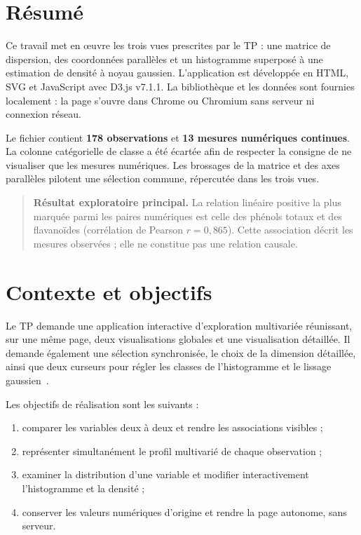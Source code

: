 \documentclass[11pt,a4paper]{article}
\newcommand{\metric}[2]{\textcolor{#1}{\textbf{#2}}}
\begin{document}
\tableofcontents
\thispagestyle{fancy}
\clearpage

\section{Résumé}
Ce travail met en œuvre les trois vues prescrites par le TP : une matrice de dispersion, des coordonnées parallèles et un histogramme superposé à une estimation de densité à noyau gaussien. L'application est développée en HTML, SVG et JavaScript avec D3.js v7.1.1. La bibliothèque et les données sont fournies localement : la page s'ouvre dans Chrome ou Chromium sans serveur ni connexion réseau.

Le fichier contient \metric{MatrixBlue}{178 observations} et \metric{MatrixBlue}{13 mesures numériques continues}. La colonne catégorielle de classe a été écartée afin de respecter la consigne de ne visualiser que les mesures numériques. Les brossages de la matrice et des axes parallèles pilotent une sélection commune, répercutée dans les trois vues.

\begin{quote}\small\color{Navy}\textbf{Résultat exploratoire principal.} La relation linéaire positive la plus marquée parmi les paires numériques est celle des phénols totaux et des flavanoïdes (corrélation de Pearson $r=0{,}865$). Cette association décrit les mesures observées ; elle ne constitue pas une relation causale.\end{quote}

\section{Contexte et objectifs}
Le TP demande une application interactive d'exploration multivariée réunissant, sur une même page, deux visualisations globales et une visualisation détaillée. Il demande également une sélection synchronisée, le choix de la dimension détaillée, ainsi que deux curseurs pour régler les classes de l'histogramme et le lissage gaussien~\cite{tp}.

Les objectifs de réalisation sont les suivants :
\begin{enumerate}
  \item comparer les variables deux à deux et rendre les associations visibles ;
  \item représenter simultanément le profil multivarié de chaque observation ;
  \item examiner la distribution d'une variable et modifier interactivement l'histogramme et la densité ;
  \item conserver les valeurs numériques d'origine et rendre la page autonome, sans serveur.
\end{enumerate}
\end{document}
